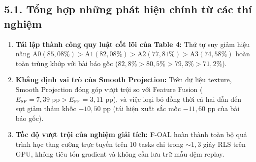 \documentclass{article}
\begin{document}
\subsection{5.1. Tổng hợp những phát hiện chính từ các thí nghiệm}
\begin{enumerate}
    \item \textbf{Tái lập thành công quy luật cốt lõi của Table 4:} Thứ tự suy giảm hiệu năng $\text{A0} (85,08\%) > \text{A1} (82,08\%) > \text{A2} (77,81\%) > \text{A3} (74,58\%)$ hoàn toàn trùng khớp với bài báo gốc ($82,8\% > 80,5\% > 79,3\% > 71,2\%$).
    \item \textbf{Khẳng định vai trò của Smooth Projection:} Trên dữ liệu texture, Smooth Projection đóng góp vượt trội so với Feature Fusion ($E_{\text{SP}} = 7,39\text{ pp} > E_{\text{FF}} = 3,11\text{ pp}$), và việc loại bỏ đồng thời cả hai dẫn đến sụt giảm thảm khốc $-10,50\text{ pp}$ (tái hiện xuất sắc mốc $-11,60\text{ pp}$ của bài báo gốc).
    \item \textbf{Tốc độ vượt trội của nghiệm giải tích:} F-OAL hoàn thành toàn bộ quá trình học tăng cường trực tuyến trên 10 tasks chỉ trong $\sim 1,3$ giây RLS trên GPU, không tiêu tốn gradient và không cần lưu trữ mẫu đệm replay.
\end{enumerate}
\end{document}
